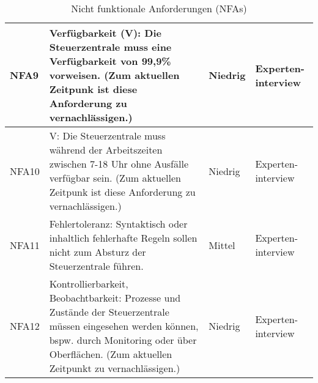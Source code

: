 \begin{table}[hbt!]
\begin{center}
\begin{tabular}{ | p{1.0cm} | p{9.7cm} | p{1.6cm} | p{2.6cm} | }
            \hline
                NFA9 & Verfügbarkeit (V): Die Steuerzentrale muss eine Verfügbarkeit von 99,9\% vorweisen. (Zum aktuellen Zeitpunk ist diese Anforderung zu vernachlässigen.) & Niedrig & Experten-interview \\ 
            \hline
                NFA10 & V: Die Steuerzentrale muss während der Arbeitszeiten zwischen 7-18 Uhr ohne Ausfälle verfügbar sein. (Zum aktuellen Zeitpunk ist diese Anforderung zu vernachlässigen.) & Niedrig & Experten-interview \\ 
            \hline
                NFA11 & Fehlertoleranz: Syntaktisch oder inhaltlich fehlerhafte Regeln sollen nicht zum Absturz der Steuerzentrale führen. & Mittel & Experten-interview \\ 
            \hline  
                NFA12 & Kontrollierbarkeit, Beobachtbarkeit: Prozesse und Zustände der Steuerzentrale müssen eingesehen werden können, bspw. durch Monitoring oder über Oberflächen. (Zum aktuellen Zeitpunkt zu vernachlässigen.) & Niedrig & Experten-interview \\
            \hline
        \end{tabular}
    \end{center}
    \caption{Nicht funktionale Anforderungen (NFAs)}
    \label{tab:notfunctionalRequirements}
\end{table}